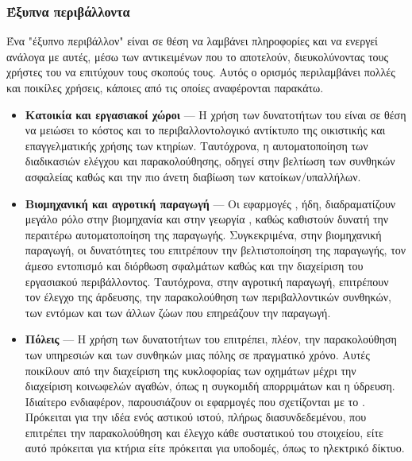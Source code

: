 \subsubsection{Έξυπνα περιβάλλοντα}
Ένα "έξυπνο περιβάλλον" είναι σε θέση να λαμβάνει πληροφορίες και να ενεργεί ανάλογα με αυτές, μέσω των αντικειμένων που το αποτελούν, διευκολύνοντας τους χρήστες του να επιτύχουν τους σκοπούς τους. Αυτός ο ορισμός περιλαμβάνει πολλές και ποικίλες χρήσεις, κάποιες από τις οποίες αναφέρονται παρακάτω. 
\begin{itemize}
    \item \textbf{Κατοικία και εργασιακοί χώροι} --- Η χρήση των δυνατοτήτων του  είναι σε θέση να μειώσει το κόστος και το περιβαλλοντολογικό αντίκτυπο της οικιστικής και επαγγελματικής χρήσης των κτηρίων\cite{iothome}. Ταυτόχρονα, η αυτοματοποίηση των διαδικασιών ελέγχου και παρακολούθησης, οδηγεί στην βελτίωση των συνθηκών ασφαλείας καθώς και την πιο άνετη διαβίωση των κατοίκων/υπαλλήλων.
    \item \textbf{Βιομηχανική και αγροτική παραγωγή} --- Οι εφαρμογές , ήδη, διαδραματίζουν μεγάλο ρόλο στην βιομηχανία \cite{iotmanuf} και στην γεωργία \cite{iotagric}, καθώς καθιστούν δυνατή την περαιτέρω αυτοματοποίηση της παραγωγής.
    Συγκεκριμένα, στην βιομηχανική παραγωγή, οι δυνατότητες του  επιτρέπουν την βελτιστοποίηση της παραγωγής, τον άμεσο εντοπισμό και διόρθωση σφαλμάτων καθώς και την διαχείριση του εργασιακού περιβάλλοντος.
    Ταυτόχρονα, στην αγροτική παραγωγή, επιτρέπουν τον έλεγχο της άρδευσης, την παρακολούθηση των περιβαλλοντικών συνθηκών, των εντόμων και των άλλων ζώων που επηρεάζουν την παραγωγή.
    \item \textbf{Πόλεις} --- Η χρήση των δυνατοτήτων του  επιτρέπει, πλέον, την παρακολούθηση των υπηρεσιών και των συνθηκών μιας πόλης σε πραγματικό χρόνο.
    Αυτές ποικίλουν από την διαχείριση της κυκλοφορίας των οχημάτων μέχρι την διαχείριση κοινωφελών αγαθών, όπως η συγκομιδή απορριμάτων και η ύδρευση.
    Ιδιαίτερο ενδιαφέρον, παρουσιάζουν οι εφαρμογές που σχετίζονται με το  \cite{iotcity}.
    Πρόκειται για την ιδέα ενός αστικού ιστού, πλήρως διασυνδεδεμένου, που επιτρέπει την παρακολούθηση και έλεγχο κάθε συστατικού του στοιχείου, είτε αυτό πρόκειται για κτήρια είτε πρόκειται για υποδομές, όπως το ηλεκτρικό δίκτυο.
\end{itemize}

